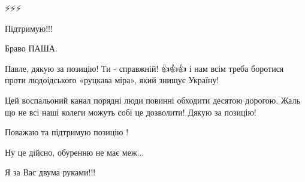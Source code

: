 \begin{itemize}
⚡⚡⚡

 
Підтримую!!!

 
Браво ПАША.

 
Павле, дякую за позицію! Ти - справжній! 👍👍👍 і нам всім треба боротися проти
людоідського «руцкава міра», який знищує Україну!


 

Цей воспальоний канал порядні люди повинні обходити десятою дорогою. Жаль що не
всі наші колеги можуть собі це дозволити! Дякую за позицію!

 
Поважаю та підтримую позицію !

 

Ну це дійсно, обуренню не має меж...

Я за Вас двума руками!!!

\end{itemize}

